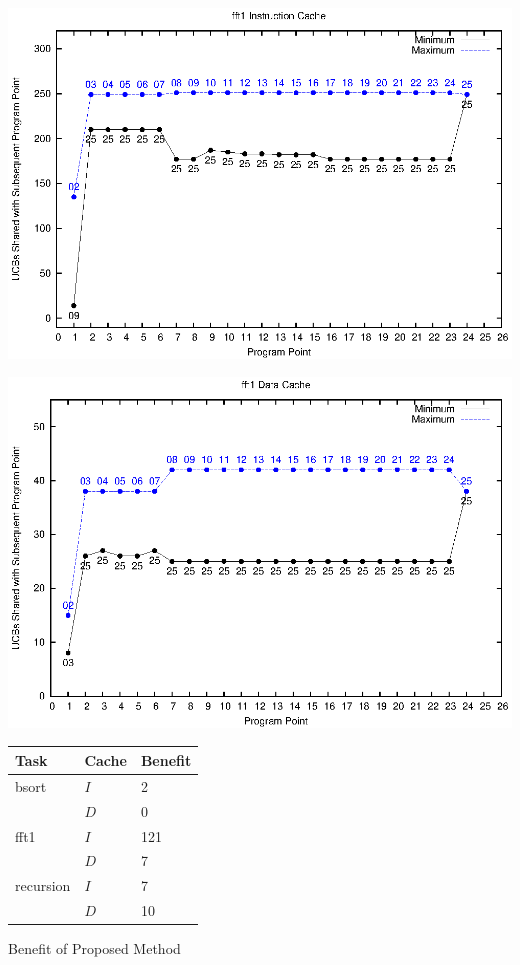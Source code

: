 
\begin{center}
  \includegraphics[width=\linewidth]{eps/fft1-icache.eps}
\end{center}

\begin{center}
  \includegraphics[width=\linewidth]{eps/fft1-dcache.eps}
\end{center}

\begin{minipage}{\linewidth}
\centering
    \begin{tabular}{l l | l}
      Task & Cache & Benefit \\ \hline
      bsort & ${I}$ & 2 \\ 
      & ${D}$ & 0 \\
      \hline
      fft1  & ${I}$ & 121 \\
      & ${D}$ & 7 \\
      \hline
      recursion & ${I}$ & 7 \\
      & ${D}$ & 10 \\
    \end{tabular}
    \bigskip

    Benefit of Proposed Method
    \bigskip
\end{minipage}

